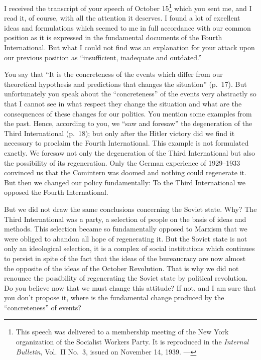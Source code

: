 

I received the transcript of your speech of October 15\footnote{This speech was delivered to a membership meeting of the New York organization of the Socialist Workers Party. It is reproduced in the \emph{Internal Bulletin}, Vol.~II No.~3, issued on November 14, 1939. ---\ed} which you sent me, and I read it, of course, with all the attention it deserves. I found a lot of excellent ideas and formulations which seemed to me in full accordance with our common position as it is expressed in the fundamental documents of the Fourth International. But what I could not find was an explanation for your attack upon our previous position as “insufficient, inadequate and outdated.”

You say that “It is the concreteness of the events which differ from our theoretical hypothesis and predictions that changes the situation” (p.~17). But unfortunately you speak about the “concreteness” of the events very abstractly so that I cannot see in what respect they change the situation and what are the consequences of these changes for our politics. You mention some examples from the past. Hence, according to you, we “saw and foresaw” the degeneration of the Third International (p.~18); but only after the Hitler victory did we find it necessary to proclaim the Fourth International. This example is not formulated exactly. We foresaw not only the degeneration of the Third International but also the possibility of its regeneration. Only the German experience of 1929--1933 convinced us that the Comintern was doomed and nothing could regenerate it. But then we changed our policy fundamentally: To the Third International we opposed the Fourth International.

But we did not draw the same conclusions concerning the Soviet state. Why? The Third International was a party, a selection of people on the basis of ideas and methods. This selection became so fundamentally opposed to Marxism that we were obliged to abandon all hope of regenerating it. But the Soviet state is not only an ideological selection, it is a complex of social institutions which continues to persist in spite of the fact that the ideas of the bureaucracy are now almost the opposite of the ideas of the October Revolution. That is why we did not renounce the possibility of regenerating the Soviet state by political revolution. Do you believe now that we must change this attitude? If not, and I am sure that you don’t propose it, where is the fundamental change produced by the “concreteness” of events?

